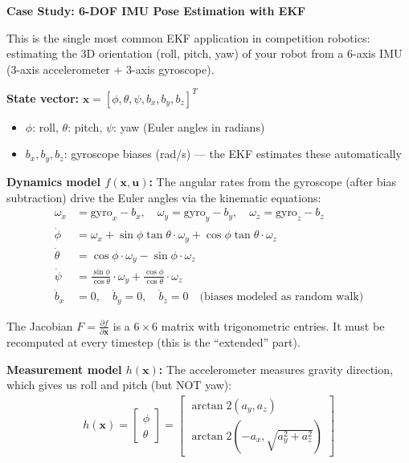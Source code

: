 \vspace{0.5em}
\begin{mdframed}[linewidth=1pt, innertopmargin=10pt, innerbottommargin=10pt]
\textbf{Case Study: 6-DOF IMU Pose Estimation with EKF}

\vspace{0.3em}
This is the single most common EKF application in competition robotics: estimating the 3D orientation (roll, pitch, yaw) of your robot from a 6-axis IMU (3-axis accelerometer + 3-axis gyroscope).

\textbf{State vector:} $\mathbf{x} = [\phi, \theta, \psi, b_x, b_y, b_z]^T$
\begin{itemize}[nosep]
    \item $\phi$: roll, $\theta$: pitch, $\psi$: yaw (Euler angles in radians)
    \item $b_x, b_y, b_z$: gyroscope biases (rad/s) --- the EKF estimates these automatically
\end{itemize}

\textbf{Dynamics model $f(\mathbf{x}, \mathbf{u})$:} The angular rates from the gyroscope (after bias subtraction) drive the Euler angles via the kinematic equations:
\begin{align}
\omega_x &= \text{gyro}_x - b_x, \quad \omega_y = \text{gyro}_y - b_y, \quad \omega_z = \text{gyro}_z - b_z \\[3pt]
\dot{\phi} &= \omega_x + \sin\phi \tan\theta \cdot \omega_y + \cos\phi \tan\theta \cdot \omega_z \\
\dot{\theta} &= \cos\phi \cdot \omega_y - \sin\phi \cdot \omega_z \\
\dot{\psi} &= \frac{\sin\phi}{\cos\theta} \cdot \omega_y + \frac{\cos\phi}{\cos\theta} \cdot \omega_z \\[3pt]
\dot{b}_x &= 0, \quad \dot{b}_y = 0, \quad \dot{b}_z = 0 \quad \text{(biases modeled as random walk)}
\end{align}

The Jacobian $F = \frac{\partial f}{\partial \mathbf{x}}$ is a $6 \times 6$ matrix with trigonometric entries. It must be recomputed at every timestep (this is the ``extended'' part).

\textbf{Measurement model $h(\mathbf{x})$:} The accelerometer measures gravity direction, which gives us roll and pitch (but NOT yaw):
\begin{align}
h(\mathbf{x}) = \begin{bmatrix} \phi \\ \theta \end{bmatrix} = \begin{bmatrix} \arctan2(a_y, a_z) \\ \arctan2(-a_x, \sqrt{a_y^2 + a_z^2}) \end{bmatrix}
\end{align}


\end{mdframed}
